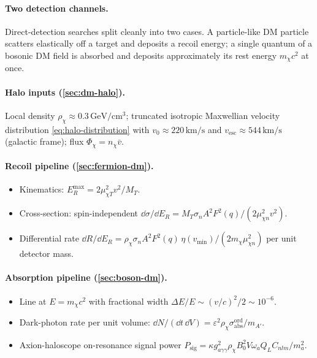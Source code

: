 \clearpage
\begin{chaptersummary}

\paragraph{Two detection channels.}
Direct-detection searches split cleanly into two cases. A
particle-like DM particle scatters elastically off a target and
deposits a recoil energy; a single quantum of a bosonic DM field
is absorbed and deposits approximately its rest energy
$m_\chi c^2$ at once.

\paragraph{Halo inputs (\cref{sec:dm-halo}).}
Local density $\rho_\chi\approx 0.3\,\text{GeV}/\text{cm}^3$;
truncated isotropic Maxwellian velocity distribution
\cref{eq:halo-distribution} with $v_0\approx 220\,\text{km}/\text{s}$
and $v_\text{esc}\approx 544\,\text{km}/\text{s}$ (galactic frame);
flux $\Phi_\chi=n_\chi\bar v$.

\paragraph{Recoil pipeline (\cref{sec:fermion-dm}).}
\begin{itemize}
  \item Kinematics: $E_R^\text{max}=2\mu_{\chi T}^2 v^2/M_T$.
  \item Cross-section: spin-independent
        $\dd\sigma/\dd E_R=M_T\sigma_n A^2 F^2(q)/(2\mu_{\chi n}^2 v^2)$.
  \item Differential rate
        $\dd R/\dd E_R=\rho_\chi\sigma_n A^2 F^2(q)\,\eta(v_\text{min})/(2 m_\chi\mu_{\chi n}^2)$
        per unit detector mass.
\end{itemize}

\paragraph{Absorption pipeline (\cref{sec:boson-dm}).}
\begin{itemize}
  \item Line at $E=m_\chi c^2$ with fractional width
        $\Delta E/E\sim (v/c)^2/2\sim 10^{-6}$.
  \item Dark-photon rate per unit volume:
        $\dd N/(\dd t\,\dd V)=\varepsilon^2\rho_\chi\sigma_\text{abs}^\text{ord}/m_{A'}$.
  \item Axion-haloscope on-resonance signal power
        $P_\text{sig}=\kappa g_{a\gamma\gamma}^2\rho_\chi B_0^2 V \omega_a Q_L C_{nlm}/m_a^2$.
\end{itemize}


\end{chaptersummary}
